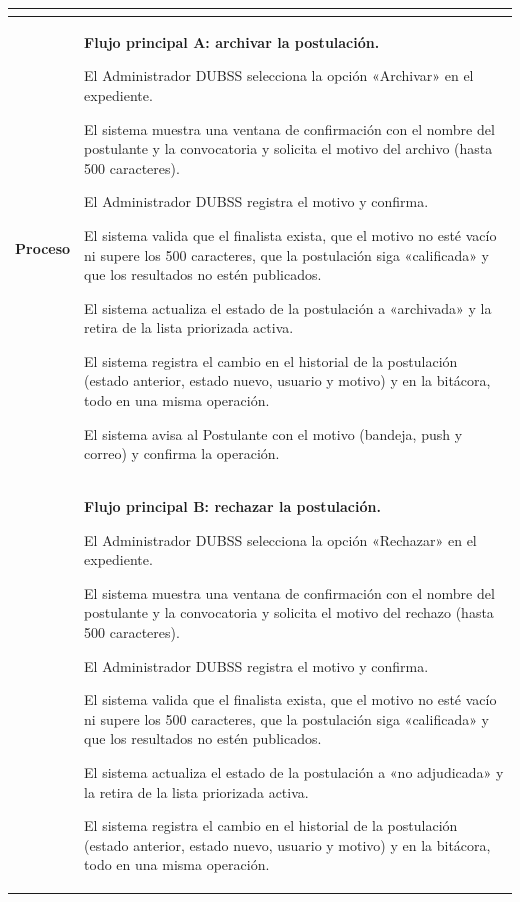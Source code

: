 \begin{longtable}{>{\raggedright\arraybackslash}p{2.9cm} >{\raggedright\arraybackslash}p{12.6cm}}
\begin{cuvin}
\end{cuvin} \\
\midrule
\textbf{Proceso} & \textbf{Flujo principal A: archivar la postulación.}
\begin{cupasos}
    \item El Administrador DUBSS selecciona la opción «Archivar» en el expediente.
    \item El sistema muestra una ventana de confirmación con el nombre del postulante y la convocatoria y solicita el motivo del archivo (hasta 500 caracteres).
    \item El Administrador DUBSS registra el motivo y confirma.
    \item El sistema valida que el finalista exista, que el motivo no esté vacío ni supere los 500 caracteres, que la postulación siga «calificada» y que los resultados no estén publicados.
    \item El sistema actualiza el estado de la postulación a «archivada» y la retira de la lista priorizada activa.
    \item El sistema registra el cambio en el historial de la postulación (estado anterior, estado nuevo, usuario y motivo) y en la bitácora, todo en una misma operación.
    \item El sistema avisa al Postulante con el motivo (bandeja, push y correo) y confirma la operación.
\end{cupasos} \\
 & \textbf{Flujo principal B: rechazar la postulación.}
\begin{cupasos}
    \item El Administrador DUBSS selecciona la opción «Rechazar» en el expediente.
    \item El sistema muestra una ventana de confirmación con el nombre del postulante y la convocatoria y solicita el motivo del rechazo (hasta 500 caracteres).
    \item El Administrador DUBSS registra el motivo y confirma.
    \item El sistema valida que el finalista exista, que el motivo no esté vacío ni supere los 500 caracteres, que la postulación siga «calificada» y que los resultados no estén publicados.
    \item El sistema actualiza el estado de la postulación a «no adjudicada» y la retira de la lista priorizada activa.
    \item El sistema registra el cambio en el historial de la postulación (estado anterior, estado nuevo, usuario y motivo) y en la bitácora, todo en una misma operación.

\end{cupasos}
\end{longtable}
